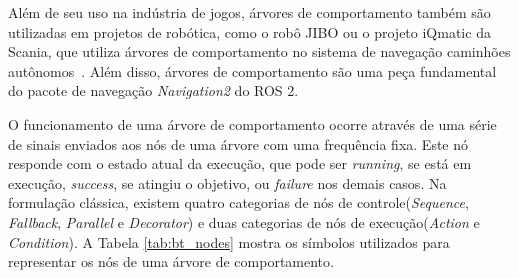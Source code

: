 \documentclass[repeatfields,xlists,xpacks,oneside,yearsonly]{ufrgscca}
\begin{document}
Além de seu uso na indústria de jogos, árvores de comportamento também são utilizadas
em projetos de robótica, como o robô JIBO ou
o projeto iQmatic da Scania, que utiliza árvores de comportamento no sistema de navegação
caminhões autônomos~\cite{BehaviorTree}.
Além disso, árvores de comportamento são uma peça fundamental do pacote de navegação
\textit{Navigation2} do ROS 2.

O funcionamento de uma árvore de comportamento ocorre através de uma série de
sinais enviados aos nós de uma árvore com uma frequência fixa.
Este nó responde com o estado atual da execução, que pode ser \textit{running},
se está em execução, \textit{success}, se atingiu o objetivo, ou \textit{failure}
nos demais casos.
Na formulação clássica, existem quatro categorias de nós de controle(\textit{Sequence},
\textit{Fallback}, \textit{Parallel} e \textit{Decorator}) e duas categorias
de nós de execução(\textit{Action} e \textit{Condition}).
A Tabela \ref{tab:bt_nodes} mostra os símbolos utilizados para representar
os nós de uma árvore de comportamento.
\end{document}
